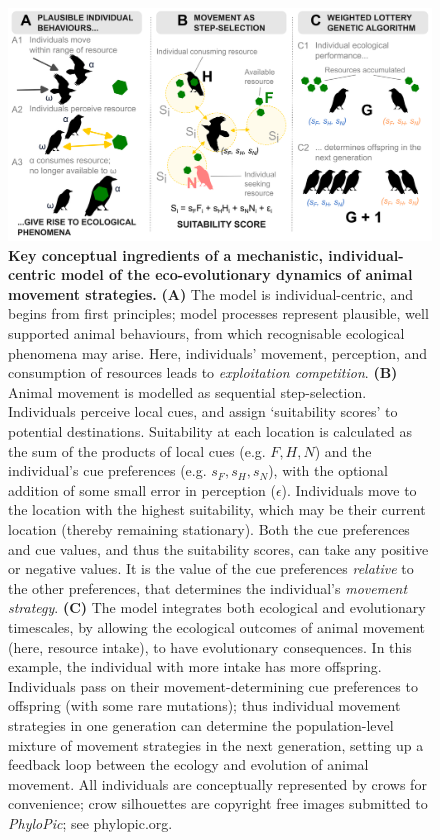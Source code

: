 \begin{figure}
  \centering
  \includegraphics[width=0.9\linewidth]{figures/introduction/fig_concept.png}
  \caption{
      \textbf{Key conceptual ingredients of a mechanistic, individual-centric model of the eco-evolutionary dynamics of animal movement strategies.}
      \textbf{(A)} The model is individual-centric, and begins from first principles; model processes represent plausible, well supported animal behaviours, from which recognisable ecological phenomena may arise. Here, individuals' movement, perception, and consumption of resources leads to \textit{exploitation competition}.
      \textbf{(B)} Animal movement is modelled as sequential step-selection. Individuals perceive local cues, and assign `suitability scores' to potential destinations. Suitability at each location is calculated as the sum of the products of local cues (e.g. $F, H, N$) and the individual's cue preferences (e.g. $s_F, s_H, s_N$), with the optional addition of some small error in perception ($\epsilon$). Individuals move to the location with the highest suitability, which may be their current location (thereby remaining stationary). Both the cue preferences and cue values, and thus the suitability scores, can take any positive or negative values. It is the value of the cue preferences \textit{relative} to the other preferences, that determines the individual's \textit{movement strategy}.
      \textbf{(C)} The model integrates both ecological and evolutionary timescales, by allowing the ecological outcomes of animal movement (here, resource intake), to have evolutionary consequences. In this example, the individual with more intake has more offspring. Individuals pass on their movement-determining cue preferences to offspring (with some rare mutations); thus individual movement strategies in one generation can determine the population-level mixture of movement strategies in the next generation, setting up a feedback loop between the ecology and evolution of animal movement.
      All individuals are conceptually represented by crows for convenience; crow silhouettes are copyright free images submitted to \textit{PhyloPic}; see phylopic.org.
  }
  \label{fig:concepts}
\end{figure}

